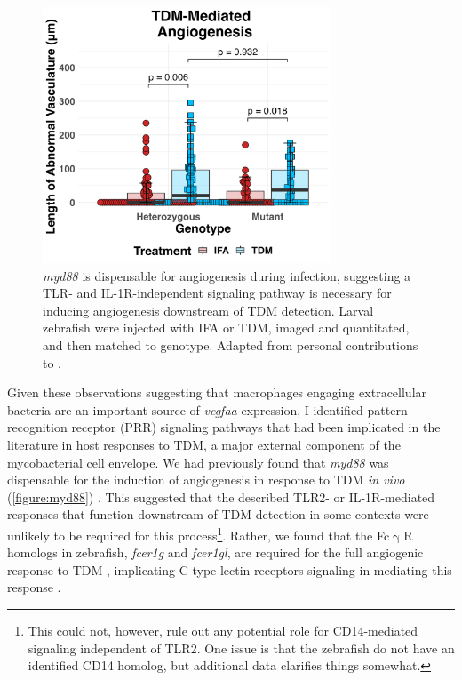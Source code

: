 \begin{figure}
\centering
\includegraphics[height=3in]{images/JB96_myd88_TDM_103022.png}
\caption[\textit{myd88} is dispensable for angiogenesis]{\textit{myd88} is dispensable for angiogenesis during infection, suggesting a TLR\hyp{} and IL\hyp{}1R\hyp{}independent signaling pathway is necessary for inducing angiogenesis downstream of TDM detection. Larval zebrafish were injected with IFA or TDM, imaged and quantitated, and then matched to genotype. Adapted from personal contributions to \citet{Walton2018}.}
\label{figure:myd88}

\end{figure}

Given these observations suggesting that macrophages engaging extracellular bacteria are an important source of \textit{vegfaa} expression, I identified pattern recognition receptor (PRR) signaling pathways that had been implicated in the literature in host responses to TDM, a major external component of the mycobacterial cell envelope. We had previously found that \textit{myd88} was dispensable for the induction of angiogenesis in response to TDM \textit{in vivo} (\autoref{figure:myd88}) \citep{Bowdish2009, Walton2018}. This suggested that the described TLR2\hyp{} or IL\hyp{}1R\hyp{}mediated responses that function downstream of TDM detection in some contexts were unlikely to be required for this process\footnote{This could not, however, rule out any potential role for CD14\hyp{}mediated signaling independent of TLR2. One issue is that the zebrafish do not have an identified CD14 homolog, but additional data clarifies things somewhat.}. Rather, we found that the Fc$\upgamma$R homologs in zebrafish, \textit{fcer1g} and \textit{fcer1gl}, are required for the full angiogenic response to TDM \citep{Walton2018}, implicating C\hyp{}type lectin receptors signaling in mediating this response \citep{Richardson2014, Zhao2014}.

